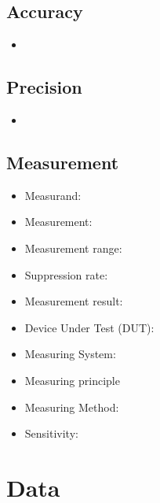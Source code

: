 \documentclass{scrartcl}
\begin{document}
\subsection{Accuracy}
\begin{itemize}
\item
\end{itemize}

\subsection{Precision}
\begin{itemize}
\item
\end{itemize}


\subsection{Measurement}
\begin{itemize}
\item Measurand:
\item Measurement:
\item Measurement range:
\item Suppression rate:
\item Measurement result:
\item Device Under  Test (DUT): 
\item Measuring System:
\item Measuring principle
\item Measuring Method:
\item Sensitivity:
\end{itemize}


\section{Data}
\end{document}
